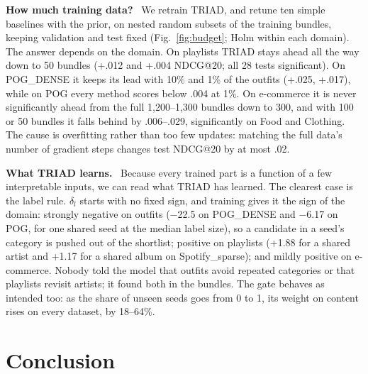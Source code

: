 \documentclass[runningheads]{llncs}
\newcommand{\deltab}{\delta}
\renewcommand{\paragraph}[1]{\smallskip\noindent\textbf{#1}\ }
\begin{document}
\paragraph{How much training data?} We retrain TRIAD, and retune ten simple baselines with the prior, on nested
random subsets of the training bundles, keeping validation and test fixed (Fig.~\ref{fig:budget}; Holm within each
domain). The answer depends on the domain. On playlists TRIAD stays ahead all the way down to 50 bundles (+.012 and
+.004 NDCG@20; all 28 tests significant). On POG\_DENSE it keeps its lead with 10\% and 1\% of the outfits (+.025,
+.017), while on POG every method scores below .004 at 1\%. On
e-commerce it is never significantly ahead from the full 1,200--1,300 bundles down to 300, and with 100 or 50
bundles it falls behind by .006--.029, significantly on Food and Clothing. The cause is overfitting rather than too
few updates: matching the full data's number of gradient steps changes test NDCG@20 by at most .02.

\paragraph{What TRIAD learns.} Because every trained part is a function of a few interpretable inputs, we can read
what TRIAD has learned. The clearest case is the label rule. $\deltab_l$ starts with no fixed sign, and training gives
it the sign of the domain: strongly negative on outfits ($-$22.5 on POG\_DENSE and $-$6.17 on POG, for one shared
seed at the median label size), so a candidate in a seed's category is pushed out of the shortlist; positive on
playlists (+1.88 for a shared artist and +1.17 for a shared album on Spotify\_sparse); and mildly positive on
e-commerce. Nobody told the model that outfits avoid repeated categories or that playlists revisit artists; it found
both in the bundles. The gate behaves as intended too: as the share of unseen seeds goes from 0 to 1, its weight on
content rises on every dataset, by 18--64\%.

\section{Conclusion}
\end{document}
